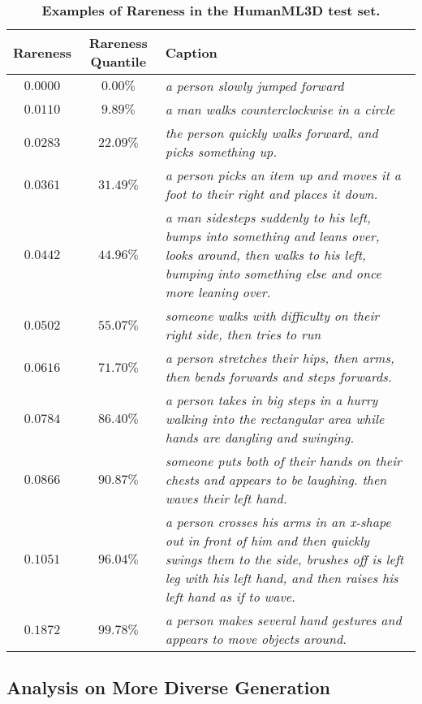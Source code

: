 \documentclass[10pt,twocolumn,letterpaper]{article}
\begin{document}
\begin{table*}[h]
\centering
\caption{\textbf{Examples of Rareness in the HumanML3D test set.}}
\label{tab:example}
\renewcommand{\arraystretch}{1.4}
\setlength{\tabcolsep}{1.4mm}
{
\begin{tabular}{ccp{12cm}}
\hline

\textbf{Rareness} & \textbf{Rareness Quantile} & \textbf{Caption} \\
\hline
$0.0000$ & $0.00\%$ & \textit{a person slowly jumped forward} \\ 
$0.0110$ & $9.89\%$ & \textit{a man walks counterclockwise in a circle} \\
$0.0283$ & $22.09\%$ & \textit{the person quickly walks forward, and picks something up.} \\
$0.0361$ & $31.49\%$ & \textit{a person picks an item up and moves it a foot to their right and places it down.} \\
$0.0442$ & $44.96\%$ & \textit{a man sidesteps suddenly to his left, bumps into something and leans over, looks around, then walks to his left, bumping into something else and once more leaning over.} \\
$0.0502$ & $55.07\%$ & \textit{someone walks with difficulty on their right side, then tries to run} \\
$0.0616$ & $71.70\%$ & \textit{a person stretches their hips, then arms, then bends forwards and steps forwards.} \\
$0.0784$ & $86.40\%$ & \textit{a person takes in big steps in a hurry walking into the rectangular area while hands are dangling and swinging.} \\
$0.0866$ & $90.87\%$ & \textit{someone puts both of their hands on their chests and appears to be laughing. then waves their left hand.} \\
$0.1051$ & $96.04\%$ & \textit{a person crosses his arms in an x-shape out in front of him and then quickly swings them to the side, brushes off is left leg with his left hand, and then raises his left hand as if to wave.} \\
$0.1872$ & $99.78\%$ & \textit{a person makes several hand gestures and appears to move objects around.} \\
\hline

\end{tabular}}
\end{table*}



\subsection{Analysis on More Diverse Generation}
\end{document}
